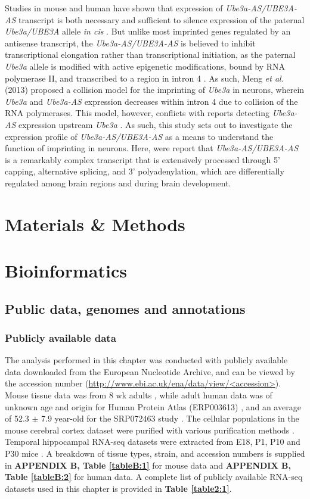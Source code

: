 Studies in mouse and human have shown that expression of \textit{Ube3a-AS/UBE3A-AS} transcript is both necessary and sufficient to silence expression of the paternal \textit{Ube3a/UBE3A} allele \textit{in cis } \cite{Meng2013,Martins-Taylor2014}. But unlike most imprinted genes regulated by an antisense transcript, the \textit{Ube3a-AS/UBE3A-AS} is believed to inhibit transcriptional elongation rather than transcriptional initiation, as the paternal \textit{Ube3a} allele is modified with active epigenetic modifications, bound by RNA polymerase II, and transcribed to a region in intron 4 \cite{Meng2013}. As such, Meng \textit{et al.} (2013) proposed a collision model for the imprinting of \textit{Ube3a} in neurons, wherein \textit{Ube3a} and \textit{Ube3a-AS} expression decreases within intron 4 due to collision of the RNA polymerases. This model, however, conflicts with reports detecting \textit{Ube3a-AS} expression upstream \textit{Ube3a} \cite{Numata2011}. As such, this study sets out to investigate the expression profile of \textit{Ube3a-AS/UBE3A-AS} as a means to understand the function of imprinting in neurons. Here, were report that \textit{Ube3a-AS/UBE3A-AS} is a remarkably complex transcript that is extensively processed through 5' capping, alternative splicing, and 3' polyadenylation, which are differentially regulated among brain regions and during brain development.

\section{Materials \& Methods}
\section*{Bioinformatics}
\subsection{Public data, genomes and annotations}
\subsubsection{Publicly available data}
The analysis performed in this chapter was conducted with publicly available data downloaded from the European Nucleotide Archive, and can be viewed by the accession number (\url{http://www.ebi.ac.uk/ena/data/view/<accession>}). Mouse tissue data was from 8 wk adults \cite{Pervouchine2015}, while adult human data was of unknown age and origin for Human Protein Atlas (ERP003613) \cite{Uhlen2015}, and an average of 52.3 $\pm$ 7.9 year-old for the SRP072463 study \cite{Lin2016}. The cellular populations in the mouse cerebral cortex dataset were purified with various purification methods \cite{Zhang2014}. Temporal hippocampal RNA-seq datasets were extracted from E18, P1, P10 and P30 mice \cite{You2015}. A breakdown of tissue types, strain, and accession numbers is supplied in \textbf{APPENDIX B, Table \ref{tableB:1}} for mouse data and \textbf{APPENDIX B, Table \ref{tableB:2}} for human data. A complete list of publicly available RNA-seq datasets used in this chapter is provided in \textbf{Table \ref{table2:1}}. 

